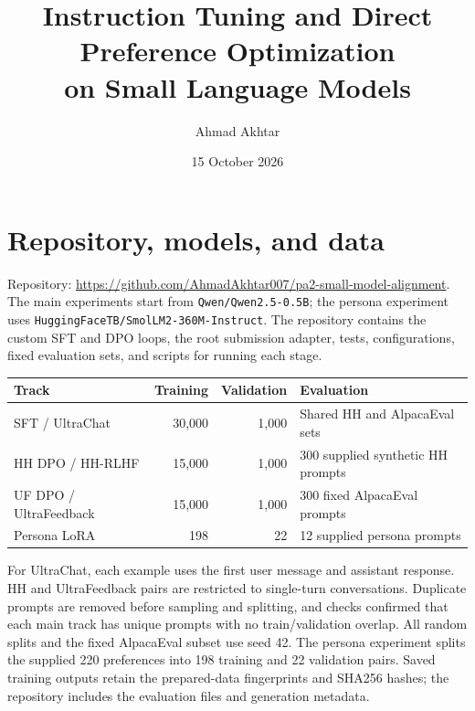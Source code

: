 \documentclass[10pt,a4paper]{article}
\title{Instruction Tuning and Direct Preference Optimization\\on Small Language Models}
\author{Ahmad Akhtar \quad 28100155}
\date{15 October 2026}
\begin{document}
\maketitle
\vspace{-1.2em}
\section{Repository, models, and data}
Repository: \url{https://github.com/AhmadAkhtar007/pa2-small-model-alignment}.
The main experiments start from \texttt{Qwen/Qwen2.5-0.5B}; the persona experiment uses \texttt{HuggingFaceTB/SmolLM2-360M-Instruct}. The repository contains the custom SFT and DPO loops, the root submission adapter, tests, configurations, fixed evaluation sets, and scripts for running each stage.

\begin{center}\small
\begin{tabular}{lrrl}\toprule
Track & Training & Validation & Evaluation\\\midrule
SFT / UltraChat & 30,000 & 1,000 & Shared HH and AlpacaEval sets\\
HH DPO / HH-RLHF & 15,000 & 1,000 & 300 supplied synthetic HH prompts\\
UF DPO / UltraFeedback & 15,000 & 1,000 & 300 fixed AlpacaEval prompts\\
Persona LoRA & 198 & 22 & 12 supplied persona prompts\\\bottomrule
\end{tabular}\end{center}
For UltraChat, each example uses the first user message and assistant response. HH and UltraFeedback pairs are restricted to single-turn conversations. Duplicate prompts are removed before sampling and splitting, and checks confirmed that each main track has unique prompts with no train/validation overlap. All random splits and the fixed AlpacaEval subset use seed 42. The persona experiment splits the supplied 220 preferences into 198 training and 22 validation pairs. Saved training outputs retain the prepared-data fingerprints and SHA256 hashes; the repository includes the evaluation files and generation metadata.
\end{document}
